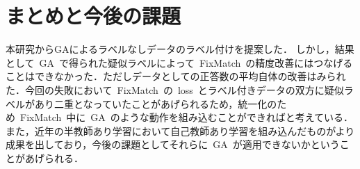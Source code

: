 \documentclass[twocolumn]{jarticle}     %
\begin{document}
\section{まとめと今後の課題}
 本研究からGAによるラベルなしデータのラベル付けを提案した．
 しかし，結果として\ GA\ で得られた疑似ラベルによって\ FixMatch\ の精度改善にはつなげることはできなかった．ただしデータとしての正答数の平均自体の改善はみられた．今回の失敗において\ FixMatch\ の\ loss\ とラベル付きデータの双方に疑似ラベルがあり二重となっていたことがあげられるため，統一化のため\ FixMatch\ 中に\ GA\ のような動作を組み込むことができればと考えている．
 また，近年の半教師あり学習において自己教師あり学習を組み込んだもの\cite{chen2020simple}がより成果を出しており，今後の課題としてそれらに\ GA\ が適用できないかということがあげられる．



\end{document}
